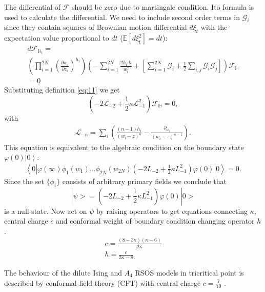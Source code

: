 \documentclass[12pt]{article}
\begin{document}
The differential of $\mathcal{F}$ should be zero due to martingale condition.  Ito formula is used to calculate the differential. We need to include second order terms in  $\mathcal{G}_{i}$ since they contain squares of Brownian motion differential $d\xi_{t}$ with the expectation value proportional to $dt$ ($\mathbb{E}[d\xi_{t}^{2}]=dt$):
\begin{multline}
d \mathcal{F}_{\mathbb{H}_{t}}=\\ \left(\prod_{i=1}^{2N}\left(\frac{\partial w_{i}}{\partial z_{i}}\right)^{h_{i}}\right)
\left(-\sum_{i=1}^{2N}\frac{2h_{i}dt}{w_{i}^{2}}+\left[\sum_{i=1}^{2N}\mathcal{G}_{i}+\frac{1}{2}
      \sum_{i,j}\mathcal{G}_{i}\mathcal{G}_{j}\right]\right)\mathcal{F}_{\mathbb{H}}\\=0
\label{eq:8}
\end{multline}
Substituting  definition \eqref{eq:11} we get 
\begin{equation}
  \left(-2 \mathcal{L}_{-2}+\frac{1}{2}\kappa \mathcal{L}_{-1}^{2}\right)        \mathcal{F}_{\mathbb{H}}=0,
  \label{eq:4}
\end{equation}
with
\begin{eqnarray*}
  \mathcal{L}_{-n}=\sum_{i}\left(\frac{(n-1)h_{i}}{(w_{i}-z)^{n}}-\frac{\partial_{w_{i}}}{(w_{i}-z)^{n-1}}\right).
\end{eqnarray*}
This equation is equivalent to the algebraic condition on the boundary state $\varphi(0)\left|0\right>$:
\begin{multline}
  \label{eq:7}
  \left<0\left|\varphi(\infty)\phi_{1}(w_{1})\dots\phi_{2N}(w_{2N})
  \left(-2L_{-2}+\frac{1}{2}\kappa L_{-1}^{2}\right)
\varphi(0)\right|0\right>=0.
\end{multline}
Since the set $\{\phi_{i}\}$ consists of arbitrary primary fields we conclude that 
\begin{equation}
|\psi>=\left(-2L_{-2}+\frac{1}{2}\kappa L_{-1}^{2}\right)
\varphi(0)|0>
\end{equation}
is a null-state. Now act on $\psi$ by raising operators to get
equations connecting  $\kappa$, central charge $c$ and conformal
weight of boundary condition changing operator $h$.
\begin{eqnarray}
  \label{eq:15}
  c=\frac{(8-3\kappa)(\kappa-6)}{2\kappa}\\
  h=\frac{c}{3\kappa-8}
\end{eqnarray}


The behaviour of the dilute Ising and $A_4$ RSOS  models in tricritical
point is described by conformal field theory (CFT) with central charge $c=\frac{7}{10}$
\cite{friedan1985superconformal}. 
\end{document}
